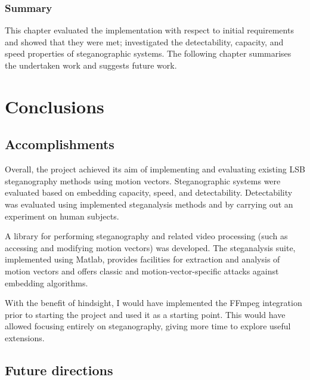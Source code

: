 \documentclass[12pt,british,twoside,notitlepage,usenames,dvipsnames,hypens,final]{report}
\numberwithin{equation}{section}
\numberwithin{figure}{section}
\begin{document}
\bigskip\bigskip
\subsection*{Summary}
This chapter evaluated the implementation with respect to initial requirements and showed that they were met; investigated the detectability, capacity, and speed properties of steganographic systems. The following chapter summarises the undertaken work and suggests future work.

\cleardoublepage
\chapter{Conclusions}

\section{Accomplishments}

Overall, the project achieved its aim of implementing and evaluating existing LSB steganography methods using motion vectors. Steganographic systems were evaluated based on embedding capacity, speed, and detectability. Detectability was evaluated using implemented steganalysis methods and by carrying out an experiment on human subjects.

A library for performing steganography and related video processing (such as accessing and modifying motion vectors) was developed. The steganalysis suite, implemented using Matlab, provides facilities for extraction and analysis of motion vectors and offers classic and motion-vector-specific attacks against embedding algorithms.

With the benefit of hindsight, I would have implemented the FFmpeg integration prior to starting the project and used it as a starting point. This would have allowed focusing entirely on steganography, giving more time to explore useful extensions.

\section{Future directions}
\end{document}
